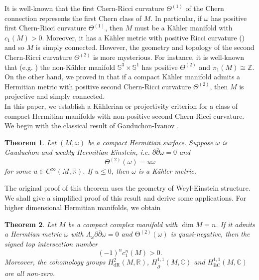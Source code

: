 \documentclass[12pt]{amsart}
\newcommand\bp{{\bar\partial}}
\theoremstyle{plain}
\newtheorem{thm}{Theorem}[section]
\theoremstyle{definition}
\newcommand{\btheorem}{\begin{thm}}
\newcommand{\etheorem}{\end{thm}}
\newcommand{\p}{\partial}
\renewcommand{\bar}{\overline}
\newcommand{\beq}{\begin{equation}}
\newcommand{\eeq}{\end{equation}}
\renewcommand{\hat}{\widehat}
\renewcommand{\bp}{\bar{\partial}}
\renewcommand{\S}{{\mathbb S}}
\newcommand{\Z}{{\mathbb Z}}
\renewcommand{\>}{\rightarrow}
\newcommand{\C}{{\mathbb C}}
\newcommand{\R}{{\mathbb R}}
\numberwithin{equation}{section} %
\begin{document}
 




  It is well-known that  the first Chern-Ricci curvature $\Theta^{(1)}$ of the  Chern connection represents the first Chern class of  $M$.  In particular, if $\omega$ has positive first Chern-Ricci curvature  $\Theta^{(1)}$, then $M$ must be a K\"ahler manifold with  $c_1(M)>0$. Moreover, it has a K\"ahler metric with positive Ricci curvature (\cite{Yau1978}) and so $M$ is simply connected. However, the geometry and topology of the second Chern-Ricci curvature $\Theta^{(2)}$ is more mysterious.  For instance,
 it is well-known that (e.g. \cite{LiuYang2012, LiuYang2017}) the non-K\"ahler manifold $\S^3\times \S^1$ has positive  $\Theta^{(2)}$ and $\pi_1(M)\cong \Z$. On the other hand, we proved in \cite{Yang2018} that if a compact K\"ahler manifold admits a Hermitian metric with positive second Chern-Ricci curvature $\Theta^{(2)}$, then $M$ is projective and simply connected.\\
 
 
 
   In this paper, we establish a K\"ahlerian or projectivity criterion for a class of compact Hermitian manifolds with non-positive second Chern-Ricci curvature. We begin with the classical result of Gauduchon-Ivanov \cite{Gauduchon1997}. 
	
	

	\btheorem\label{main0} Let $(M,\omega)$ be a compact Hermitian surface. Suppose $\omega$ is  Gauduchon and weakly Hermitian-Einstein, i.e. $\p\bp\omega=0$ and
	\beq \Theta^{(2)}(\omega)=u \omega \eeq 
	for some $u\in C^\infty(M,\R)$. If $u\leq 0$, then $\omega$ is a K\"ahler metric.
	\etheorem
	
	
	\noindent The original proof of this theorem uses the geometry of Weyl-Einstein structure. 
	We shall give a simplified proof of this result and derive some applications.  For higher dimensional Hermitian manifolds, we obtain 
	
	
	\btheorem\label{secondChernRicci} Let $M$ be a compact complex manifold with $\dim M=n$. If it admits a Hermtian metric $\omega$ with $\Lambda_\omega\p\bp\omega=0$ and 
	$\mathrm{\Theta^{(2)}}(\omega)$ is quasi-negative, then
	the signed top intersection number $$(-1)^n c_1^n(M)>0.$$  Moreover,  the cohomology groups $H^2_{\mathrm{dR}}(M,\R)$, $H^{1,1}_{\bp}(M,\C)$ and $H^{1,1}_{\mathrm{BC}}(M,\C)$  are all non-zero. 
	\etheorem
\end{document}
